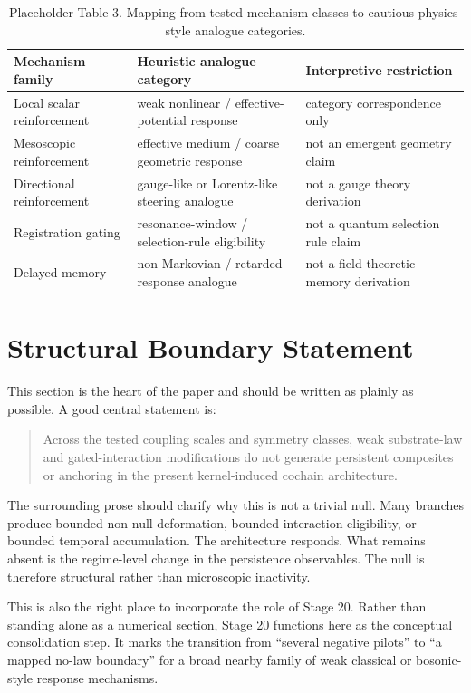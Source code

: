 \documentclass[11pt]{article}
\begin{document}
\begin{table}[h]
\centering
\small
\begin{tabular}{@{}p{1.6in}p{2.0in}p{2.2in}@{}}
\toprule
Mechanism family & Heuristic analogue category & Interpretive restriction \\
\midrule
Local scalar reinforcement & weak nonlinear / effective-potential response & category correspondence only \\
Mesoscopic reinforcement & effective medium / coarse geometric response & not an emergent geometry claim \\
Directional reinforcement & gauge-like or Lorentz-like steering analogue & not a gauge theory derivation \\
Registration gating & resonance-window / selection-rule eligibility & not a quantum selection rule claim \\
Delayed memory & non-Markovian / retarded-response analogue & not a field-theoretic memory derivation \\
\bottomrule
\end{tabular}
\caption{Placeholder Table 3. Mapping from tested mechanism classes to cautious physics-style analogue categories.}
\label{tab:physics_mapping}
\end{table}

\section{Structural Boundary Statement}

This section is the heart of the paper and should be written as plainly as possible. A good central statement is:
\begin{quote}
Across the tested coupling scales and symmetry classes, weak substrate-law and gated-interaction modifications do not generate persistent composites or anchoring in the present kernel-induced cochain architecture.
\end{quote}

The surrounding prose should clarify why this is not a trivial null. Many branches produce bounded non-null deformation, bounded interaction eligibility, or bounded temporal accumulation. The architecture responds. What remains absent is the regime-level change in the persistence observables. The null is therefore structural rather than microscopic inactivity.

This is also the right place to incorporate the role of Stage 20. Rather than standing alone as a numerical section, Stage 20 functions here as the conceptual consolidation step. It marks the transition from ``several negative pilots'' to ``a mapped no-law boundary'' for a broad nearby family of weak classical or bosonic-style response mechanisms.
\end{document}
